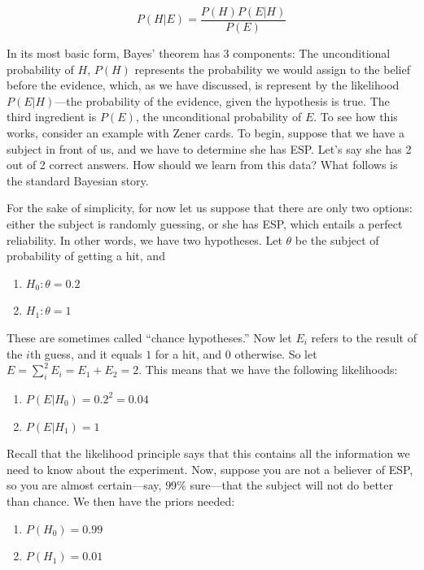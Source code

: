 \[P(H|E) = \frac{P(H)P(E|H)}{P(E)}\]

In its most basic form, Bayes' theorem has 3 components: The
unconditional probability of \(H\), \(P(H)\) represents the probability
we would assign to the belief before the evidence, which, as we have
discussed, is represent by the likelihood \(P(E|H)\)---the probability
of the evidence, given the hypothesis is true. The third ingredient is
\(P(E)\), the unconditional probability of \(E\). To see how this works,
consider an example with Zener cards. To begin, suppose that we have a
subject in front of us, and we have to determine she has ESP. Let's say
she has 2 out of 2 correct answers. How should we learn from this data?
What follows is the standard Bayesian story.

For the sake of simplicity, for now let us suppose that there are only
two options: either the subject is randomly guessing, or she has ESP,
which entails a perfect reliability. In other words, we have two
hypotheses. Let \(\theta\) be the subject of probability of getting a
hit, and

\begin{enumerate}
\def\labelenumi{\arabic{enumi}.}
\tightlist
\item
  \(H_0: \theta = 0.2\)
\item
  \(H_1: \theta = 1\)
\end{enumerate}

These are sometimes called ``chance hypotheses.'' Now let \(E_i\) refers
to the result of the \(i\)th guess, and it equals \(1\) for a hit, and
\(0\) otherwise. So let \(E = \sum_i^2 E_i = E_1 + E_2 = 2\). This means
that we have the following likelihoods:

\begin{enumerate}
\def\labelenumi{\arabic{enumi}.}
\setcounter{enumi}{2}
\tightlist
\item
  \(P(E|H_0) = 0.2^2=0.04\)
\item
  \(P(E|H_1) = 1\)
\end{enumerate}

Recall that the likelihood principle says that this contains all the
information we need to know about the experiment. Now, suppose you are
not a believer of ESP, so you are almost certain---say, \(99\%\)
sure---that the subject will not do better than chance. We then have the
priors needed:

\begin{enumerate}
\def\labelenumi{\arabic{enumi}.}
\setcounter{enumi}{4}
\tightlist
\item
  \(P(H_0) = 0.99\)
\item
  \(P(H_1) = 0.01\)
\end{enumerate}

